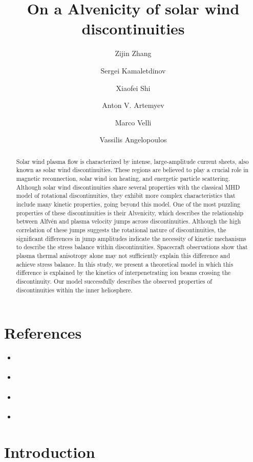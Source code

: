 \documentclass[
  letterpaper,
  DIV=11,
  numbers=noendperiod]{scrartcl}
\title{On a Alvenicity of solar wind discontinuities}
\author{Zijin Zhang \and Sergei Kamaletdinov \and Xiaofei Shi \and Anton V. Artemyev \and Marco Velli \and Vassilis Angelopoulos}
\date{}
\providecommand{\tightlist}{%
  \setlength{\itemsep}{0pt}\setlength{\parskip}{0pt}}\usepackage{longtable,booktabs,array}
\begin{document}
\maketitle
\begin{abstract}
Solar wind plasma flow is characterized by intense, large-amplitude current sheets, also known as solar wind discontinuities. These regions are believed to play a crucial role in magnetic reconnection, solar wind ion heating, and energetic particle scattering. Although solar wind discontinuities share several properties with the classical MHD model of rotational discontinuities, they exhibit more complex characteristics that include many kinetic properties, going beyond this model. One of the most puzzling properties of these discontinuities is their Alvenicity, which describes the relationship between Alfvén and plasma velocity jumps across discontinuities. Although the high correlation of these jumps suggests the rotational nature of discontinuities, the significant differences in jump amplitudes indicate the necessity of kinetic mechanisms to describe the stress balance within discontinuities. Spacecraft observations show that plasma thermal anisotropy alone may not sufficiently explain this difference and achieve stress balance. In this study, we present a theoretical model in which this difference is explained by the kinetics of interpenetrating ion beams crossing the discontinuity. Our model successfully describes the observed properties of discontinuities within the inner heliosphere.
\end{abstract}

\newcommand{\vect}[1]{\mathbf{#1}}

\section{References}\label{references}

\begin{itemize}
\tightlist
\item
  \citet{steinhauerMultifluidModelOnedimensional2008}
\item
  \citet{artemyevIonNongyrotropySolar2020}
\item
  \citet{neukirchKineticModelsTangential2020}
\item
  \citet{vaskoThinCurrentSheets2014}
\end{itemize}

\section{Introduction}\label{introduction}
\end{document}
